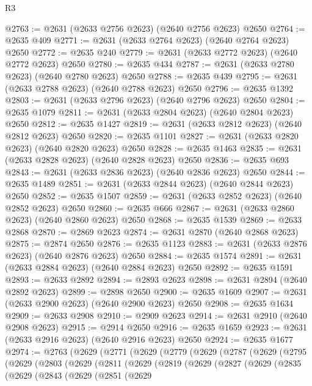 \begin{lexlean}{R3}
\begin{coremodule}
@2763 := @2631 (@2633 @2756 @2623) (@2640 @2756 @2623) @2650
@2764 := @2635 @409
@2771 := @2631 (@2633 @2764 @2623) (@2640 @2764 @2623) @2650
@2772 := @2635 @240
@2779 := @2631 (@2633 @2772 @2623) (@2640 @2772 @2623) @2650
@2780 := @2635 @434
@2787 := @2631 (@2633 @2780 @2623) (@2640 @2780 @2623) @2650
@2788 := @2635 @439
@2795 := @2631 (@2633 @2788 @2623) (@2640 @2788 @2623) @2650
@2796 := @2635 @1392
@2803 := @2631 (@2633 @2796 @2623) (@2640 @2796 @2623) @2650
@2804 := @2635 @1079
@2811 := @2631 (@2633 @2804 @2623) (@2640 @2804 @2623) @2650
@2812 := @2635 @1427
@2819 := @2631 (@2633 @2812 @2623) (@2640 @2812 @2623) @2650
@2820 := @2635 @1101
@2827 := @2631 (@2633 @2820 @2623) (@2640 @2820 @2623) @2650
@2828 := @2635 @1463
@2835 := @2631 (@2633 @2828 @2623) (@2640 @2828 @2623) @2650
@2836 := @2635 @693
@2843 := @2631 (@2633 @2836 @2623) (@2640 @2836 @2623) @2650
@2844 := @2635 @1489
@2851 := @2631 (@2633 @2844 @2623) (@2640 @2844 @2623) @2650
@2852 := @2635 @1507
@2859 := @2631 (@2633 @2852 @2623) (@2640 @2852 @2623) @2650
@2860 := @2635 @666
@2867 := @2631 (@2633 @2860 @2623) (@2640 @2860 @2623) @2650
@2868 := @2635 @1539
@2869 := @2633 @2868
@2870 := @2869 @2623
@2874 := @2631 @2870 (@2640 @2868 @2623)
@2875 := @2874 @2650
@2876 := @2635 @1123
@2883 := @2631 (@2633 @2876 @2623) (@2640 @2876 @2623) @2650
@2884 := @2635 @1574
@2891 := @2631 (@2633 @2884 @2623) (@2640 @2884 @2623) @2650
@2892 := @2635 @1591
@2893 := @2633 @2892
@2894 := @2893 @2623
@2898 := @2631 @2894 (@2640 @2892 @2623)
@2899 := @2898 @2650
@2900 := @2635 @1609
@2907 := @2631 (@2633 @2900 @2623) (@2640 @2900 @2623) @2650
@2908 := @2635 @1634
@2909 := @2633 @2908
@2910 := @2909 @2623
@2914 := @2631 @2910 (@2640 @2908 @2623)
@2915 := @2914 @2650
@2916 := @2635 @1659
@2923 := @2631 (@2633 @2916 @2623) (@2640 @2916 @2623) @2650
@2924 := @2635 @1677
@2974 := @2763
    (@2629
      (@2771
        (@2629
          (@2779
            (@2629
              (@2787
                (@2629
                  (@2795
                    (@2629
                      (@2803
                        (@2629
                          (@2811
                            (@2629
                              (@2819
                                (@2629
                                  (@2827
                                    (@2629
                                      (@2835
                                        (@2629
                                          (@2843
                                            (@2629
                                              (@2851
                                                (@2629

\end{coremodule}
\end{lexlean}
